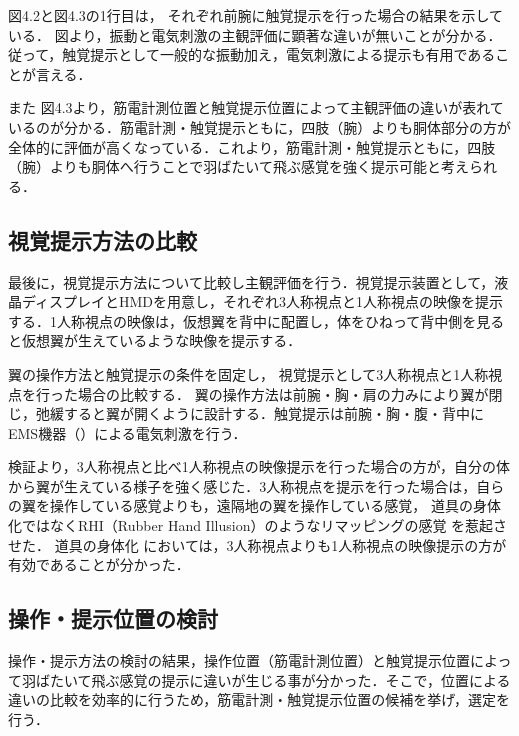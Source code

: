 \begin{small}
      図4.2と図4.3の1行目は，
      それぞれ前腕に触覚提示を行った場合の結果を示している．
      図より，振動と電気刺激の主観評価に顕著な違いが無いことが分かる．従って，触覚提示として一般的な振動加え，電気刺激による提示も有用であることが言える．

      また
      図4.3より，筋電計測位置と触覚提示位置によって主観評価の違いが表れているのが分かる．筋電計測・触覚提示ともに，四肢（腕）よりも胴体部分の方が全体的に評価が高くなっている．これより，筋電計測・触覚提示ともに，四肢（腕）よりも胴体へ行うことで羽ばたいて飛ぶ感覚を強く提示可能と考えられる．
      

    \subsection{視覚提示方法の比較} %
      最後に，視覚提示方法について比較し主観評価を行う．視覚提示装置として，液晶ディスプレイとHMDを用意し，それぞれ3人称視点と1人称視点の映像を提示する．1人称視点の映像は，仮想翼を背中に配置し，体をひねって背中側を見ると仮想翼が生えているような映像を提示する．

      翼の操作方法と触覚提示の条件を固定し，
      視覚提示として3人称視点と1人称視点を行った場合の比較する．
      翼の操作方法は前腕・胸・肩の力みにより翼が閉じ，弛緩すると翼が開くように設計する．触覚提示は前腕・胸・腹・背中にEMS機器（）による電気刺激を行う．

      検証より，3人称視点と比べ1人称視点の映像提示を行った場合の方が，自分の体から翼が生えている様子を強く感じた．3人称視点を提示を行った場合は，自らの翼を操作している感覚よりも，遠隔地の翼を操作している感覚，
      道具の身体化ではなくRHI（Rubber Hand Illusion）のようなリマッピングの感覚
      を惹起させた．
      道具の身体化
      においては，3人称視点よりも1人称視点の映像提示の方が有効であることが分かった．
  
  \subsection{操作・提示位置の検討}
    操作・提示方法の検討の結果，操作位置（筋電計測位置）と触覚提示位置によって羽ばたいて飛ぶ感覚の提示に違いが生じる事が分かった．そこで，位置による違いの比較を効率的に行うため，筋電計測・触覚提示位置の候補を挙げ，選定を行う．
  

\end{small}

